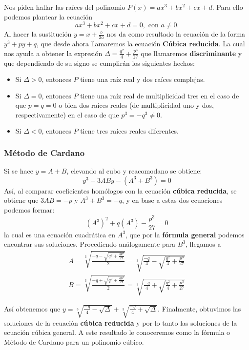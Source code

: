 Nos piden hallar las raíces del polinomio $P(x) = ax^3 + bx^2 + cx + d$.
Para ello podemos plantear la ecuación
\[
    ax^3 + bx^2 + cx + d = 0, \mbox{ con } a \neq 0.
\]
Al hacer la sustitución $y = x + \frac{b}{3a}$ nos da como resultado la ecuación de la forma $y^3 + py + q$, que desde ahora llamaremos la ecuación \textbf{Cúbica reducida}.
La cual nos ayuda a obtener la expresión $\Delta = \frac{q^2}{4} + \frac{p^3}{27}$ que llamaremos \textbf{discriminante} y que dependiendo de su signo se cumplirán los siguientes hechos:
\begin{itemize}
    \item Si $\Delta > 0$, entonces $P$ tiene una raíz real y dos raíces complejas.
    \item Si $\Delta = 0$, entonces $P$ tiene una raíz real de multiplicidad tres en el caso de que $p = q = 0$ o bien dos raíces reales (de multiplicidad uno y dos, respectivamente) en el caso de que $p^3 = -q^3 \neq 0.$
    \item Si $\Delta < 0$, entonces $P$ tiene tres raíces reales diferentes.
\end{itemize}


\subsubsection{Método de Cardano}

Si se hace $y = A + B$, elevando al cubo y reacomodano se obtiene: \[y^3 -3ABy - (A^3 + B^3) = 0\]
Así, al comparar coeficientes homólogos con la ecuación \textbf{cúbica reducida}, se obtiene que $3AB = - p$ y $A^3 + B^3 = -q$, y en base a estas dos ecuaciones podemos formar:
\[
    (A^3)^2 + q(A^3) - \frac{p^3}{27} = 0
\]
la cual es una ecuación cuadrática en $A^3$, que por la \textbf{fórmula general} podemos encontrar sus soluciones.
Procediendo análogamente para $B^3$, llegamos a
\begin{gather*}
    A = \sqrt[3]{\frac{-q - \sqrt{q^2 + \frac{4p^3}{27}}}{2}} = \sqrt[3]{\frac{-q}{4} - \sqrt{\frac{q^2}{4} + \frac{p^3}{27}}}\\
    B = \sqrt[3]{\frac{-q + \sqrt{q^2 + \frac{4p^3}{27}}}{2}} = \sqrt[3]{\frac{-q}{4} + \sqrt{\frac{q^2}{4} + \frac{p^3}{27}}}
\end{gather*}

Así obtenemos que $y = \sqrt[3]{\frac{-q}{4} - \sqrt{\Delta}} + \sqrt[3]{\frac{-q}{4} + \sqrt{\Delta}}$.
Finalmente, obtuvimos las soluciones de la ecuación \textbf{cúbica reducida} y por lo tanto las soluciones de la ecuación cúbica general.
A este resultado le conoceremos como la fórmula o Método de Cardano para un polinomio cúbico.

